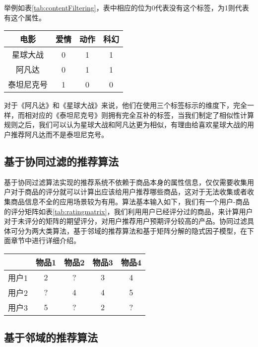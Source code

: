举例如表\ref{tab:contentFiltering}，表中相应的位为0代表没有这个标签，为1则代表有这个属性。
\begin{table*}[htbp]
    \centering
    \caption{以电影为例对基于内容的过滤进行举例}\label{tab:contentFiltering}
    \begin{tabular}{|c|c|c|c|}
        \hline
        电影 & 爱情 & 动作 & 科幻 \\ \hline
        星球大战 & 0 & 1 & 1 \\ \hline
        阿凡达 & 0 & 1 & 1 \\ \hline
        泰坦尼克号 & 1 & 0 & 0 \\ \hline
    \end{tabular}
\end{table*}
对于《阿凡达》和《星球大战》来说，他们在使用三个标签标示的维度下，完全一样，而相对应的《泰坦尼克号》则拥有完全互补的标签，当我们制定了相似性计算规则之后，我们可以认为星球大战和阿凡达更为相似，有理由给喜欢星球大战的用户推荐阿凡达而不是泰坦尼克号。

\subsection{基于协同过滤的推荐算法}
基于协同过滤算法实现的推荐系统不依赖于商品本身的属性信息，仅仅需要收集用户对于商品的评分就可以计算出应该给用户推荐哪些商品，这对于无法收集或者收集商品信息不全的应用场景较为有用。算法基本输入如下，我们有一个用户-商品的评分矩阵如表\ref{tab:ratingmatrix}，我们利用用户已经评分过的商品，来计算用户对于未评分的矩阵的期望评分，对用户推荐用户预期评分较高的产品。协同过滤具体可分为两大类算法，基于邻域的推荐算法和基于矩阵分解的隐式因子模型，在下面章节中进行详细介绍。
    \begin{table*}[htbp]
    \centering
    \caption{用户评分矩阵}\label{tab:ratingmatrix}
    \begin{tabular}{|c|c|c|c|c|}
        \hline
        & 物品1 & 物品2 & 物品3 & 物品4 \\ \hline
        用户1 & 2& ? & 3 & 4\\ \hline
        用户2 & ? &4 &  4 & 5\\ \hline
        用户3 & 5 & ?& 2 & ? \\ \hline
    \end{tabular}
    \end{table*}
    
\subsection{基于邻域的推荐算法}
